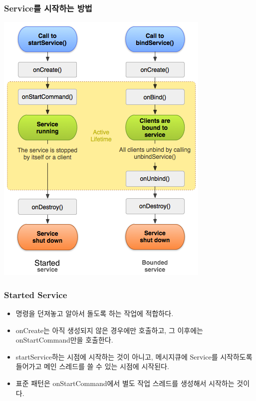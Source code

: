 \documentclass{beamer}
\begin{document}
\begin{frame}
\frametitle{Service를 시작하는 방법}
\includegraphics[scale=0.4]{service-lifecycle}
\end{frame}

\begin{frame}
\frametitle{Started Service}
\begin{itemize}
\item 명령을 던져놓고 알아서 돌도록 하는 작업에 적합하다.
\item onCreate는 아직 생성되지 않은 경우에만 호출하고, 그 이후에는 onStartCommand만을 호출한다.
\item startService하는 시점에 시작하는 것이 아니고, 메시지큐에 Service를 시작하도록 들어가고 메인 스레드를 쓸 수 있는 시점에 시작된다.
\item 표준 패턴은 onStartCommand에서 별도 작업 스레드를 생성해서 시작하는 것이다.
\end{itemize}
\end{frame}
\end{document}
